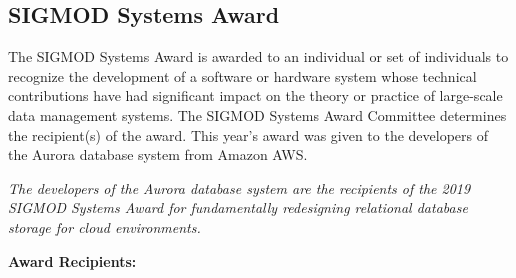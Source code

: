 \subsection*{SIGMOD Systems Award}

The SIGMOD Systems Award is awarded to an individual or set of individuals to recognize the development of a software or hardware system whose technical contributions have had significant impact on the theory or practice of large-scale data management systems.  The SIGMOD Systems Award Committee determines the recipient(s) of the award. This year's award was given to the developers of the Aurora database system from Amazon AWS.

\vspace{2mm}


\emph{The developers of the Aurora database system are the recipients of the 2019 SIGMOD Systems Award for fundamentally redesigning relational database storage for cloud environments.}


\vspace{4mm}
\textbf{Award Recipients:}
\vspace{2mm}


